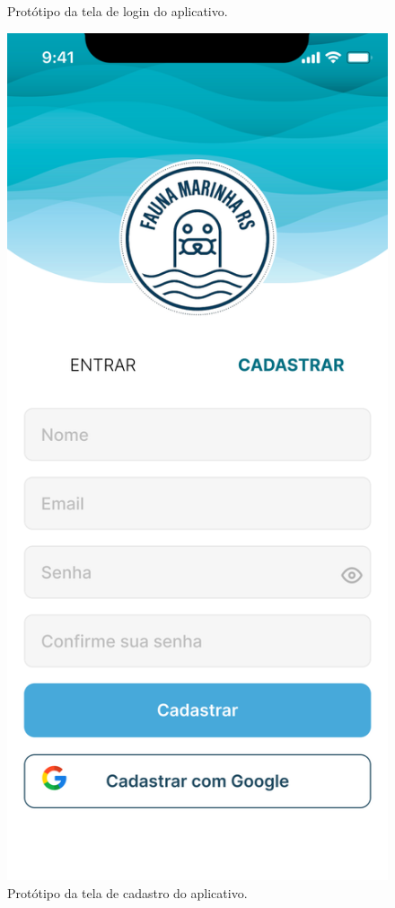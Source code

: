 \begin{figure}[H]
\begin{minipage}[b]{0.48\textwidth}
        \caption{Protótipo da tela de login do aplicativo.}
        \label{fig:prototipo-login}
    \end{minipage}
    \hfill
    \begin{minipage}[b]{0.48\textwidth}
        \centering
        \includegraphics[height=0.6\textheight]{imagens/cadastro-figma.png}
        \caption{Protótipo da tela de cadastro do aplicativo.}
        \label{fig:prototipo-cadastro}
    \end{minipage}
\end{figure}

